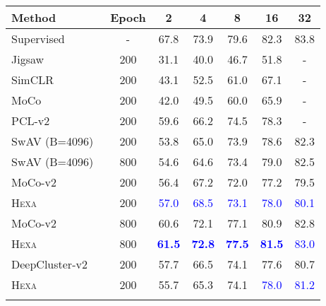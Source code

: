 \documentclass[10pt,twocolumn,letterpaper]{article}
\newcommand{\shortname}{\textsc{Hexa}}
\begin{document}
\begin{table}[t!]
\footnotesize \centering
\begin{tabular}{@{\hspace{-0pt}}l@{\hspace{8pt}}c@{\hspace{5pt}}|c@{\hspace{7pt}}c@{\hspace{7pt}}c@{\hspace{7pt}}c@{\hspace{7pt}}c }\toprule
 Method   & Epoch &  2  & 4 &  8 & 16 & 32\\ 
\hline
 Supervised~~ &  -  &  67.8 & 73.9 & 79.6 & 82.3 & 83.8  \\
\hline
Jigsaw~\cite{noroozi2016unsupervised} & 200 & 31.1 & 40.0 & 46.7 & 51.8 & - \\
SimCLR~\cite{chen2020simple} & 200 &   43.1 & 52.5 & 61.0 & 67.1 & - \\
MoCo~\cite{he2020momentum} & 200 &  42.0 & 49.5 & 60.0 & 65.9 &  -  \\        
PCL-v2~\cite{li2020prototypical} & 200 & 59.6  & 66.2 &  74.5  & 78.3 &  -\\
SwAV \!(B=4096)\!~\cite{caron2020unsupervised} & 200 & 53.8 & 65.0 & 73.9 &  78.6 &  82.3  \\
SwAV \!(B=4096)\!~\cite{caron2020unsupervised} & 800 & 54.6 & 64.6 & 73.4 &  79.0 &  82.5  \\
\hline
 MoCo-v2~\cite{chen2020improved} &  200  & 56.4  & 67.2  & 72.0  & 77.2 &  79.5 \\
\rowcolor{Gray}
\cellcolor{white}
   \shortname{}  &  200   & \textcolor{blue}{57.0}   & \textcolor{blue}{68.5}   &  \textcolor{blue}{73.1}   & \textcolor{blue}{78.0}  & \textcolor{blue}{80.1}
  \\ \hline 
 MoCo-v2~\cite{chen2020improved} &  800  & 60.6 & 72.1 & 77.1 & 80.9 & 82.8 \\
\rowcolor{Gray}
\cellcolor{white}
   \shortname{}  &  800   & \textcolor{blue}{\bf{61.5}}   & \textcolor{blue}{\bf{72.8}}   &  \textcolor{blue}{\bf{77.5}}   & \textcolor{blue}{\bf{81.5}}  & \textcolor{blue}{83.0}
  \\ \hline 
  DeepCluster-v2~\cite{caron2018deepcluster,caron2020unsupervised} &  200  &  
  57.7 &  66.5 & 74.1 & 77.6 & 80.7 \\  \rowcolor{Gray}
\cellcolor{white}
  \shortname{}  & 200  & 55.7 & 65.3 & 74.1 & \textcolor{blue}{78.0} & \textcolor{blue}{81.2}\\
 \rowcolor{Gray}
\cellcolor{white}

\end{tabular}
\end{table}
\end{document}
